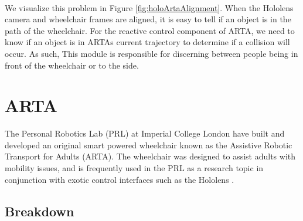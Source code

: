 \paragraph{}We visualize this problem in Figure \ref{fig:holoArtaAlignment}. When the Hololens camera and wheelchair frames are aligned, it is easy to tell if an object is in the path of the wheelchair. For the reactive control component of ARTA, we need to know if an object is in ARTAs current trajectory to determine if a collision will occur. As such, This module is responsible for discerning between people being in front of the wheelchair or to the side. 


\section{ARTA}
The Personal Robotics Lab (PRL) at Imperial College London have built and developed an original smart powered wheelchair known as the Assistive Robotic Transport for Adults (ARTA). The wheelchair was designed to assist adults with mobility issues, and is frequently used in the PRL as a research topic in conjunction with exotic control interfaces such as the Hololens \cite{Zolotas2018, Chacon-Quesada}.

\subsection{Breakdown}